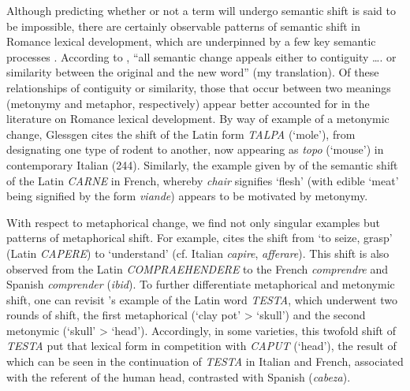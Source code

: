 \documentclass[output=paper,colorlinks,citecolor=brown,
]{langscibook}
\begin{document}
Although predicting whether or not a term will undergo semantic shift is said to be impossible, there are certainly observable patterns of semantic shift in Romance lexical development, which are underpinned by a few key semantic processes \citep[51--52]{dworkin_recent_2006}. According to \citet[243]{glessgen_linguistique_2007}, “all semantic change appeals either to contiguity …. or similarity between the original and the new word” (my translation). Of these relationships of contiguity or similarity, those that occur between two meanings (metonymy and metaphor, respectively) appear better accounted for in the literature on Romance lexical development. By way of example of a metonymic change, Glessgen cites the shift of the Latin form \textit{TALPA} (‘mole’), from designating one type of rodent to another, now appearing as \textit{topo} (‘mouse’) in contemporary Italian (244). Similarly, the example given by \citet[323]{posner_romance_1996} of the semantic shift of the Latin \textit{CARNE} in French, whereby \textit{chair} signifies ‘flesh’ (with edible ‘meat’ being signified by the form \textit{viande}) appears to be motivated by metonymy.

With respect to metaphorical change, we find not only singular examples but patterns of metaphorical shift. For example, \citet[52]{dworkin_recent_2006} cites the shift from ‘to seize, grasp’ (Latin \textit{CAPERE}) to ‘understand’ (cf. Italian \textit{capire}, \textit{afferare}). This shift is also observed from the Latin \textit{COMPRAEHENDERE} to the French \textit{comprendre} and Spanish \textit{comprender} (\textit{ibid}). To further differentiate metaphorical and metonymic shift, one can revisit \citet[245]{glessgen_linguistique_2007}'s example of the Latin word \textit{TESTA}, which underwent two rounds of shift, the first metaphorical (‘clay pot’ > ‘skull’) and the second metonymic (‘skull’ > ‘head’). Accordingly, in some varieties, this twofold shift of \textit{TESTA} put that lexical form in competition with \textit{CAPUT} (‘head’), the result of which can be seen in the continuation of \textit{TESTA} in Italian and French, associated with the referent of the human head, contrasted with Spanish (\textit{cabeza}).
\end{document}

